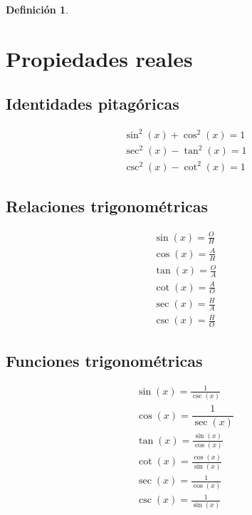 \documentclass[a5paper,12pt,twoside]{book}
\newtheorem{defn}{{Definición}}[chapter]
\begin{document}
\begin{mdframed}[style=DefinitionFrame]
    \begin{defn}
    \end{defn}
\end{mdframed}


\chapter{Propiedades reales}


\section{Identidades pitagóricas}

\begin{gather*}
    \sin^2{(x)} + \cos^2{(x)} = 1
    \\
    \sec^2{(x)} - \tan^2{(x)} = 1
    \\
    \csc^2{(x)} - \cot^2{(x)} = 1
\end{gather*}


\section{Relaciones trigonométricas}

\begin{gather*}
    \sin{(x)}=\frac{O}{H}
    \\[1ex]
    \cos{(x)}=\frac{A}{H}
    \\[1ex]
    \tan{(x)}=\frac{O}{A}
    \\[1ex]
    \cot{(x)}=\frac{A}{O}
    \\[1ex]
    \sec{(x)}=\frac{H}{A}
    \\[1ex]
    \csc{(x)}=\frac{H}{O}
\end{gather*}


\section{Funciones trigonométricas}

\begin{gather*}
    \sin{(x)}=\frac{1}{\csc{(x)}}
    \\[1ex]
    \cos{(x)}=\dfrac{1}{\sec{(x)}}
    \\[1ex]
    \tan{(x)}=\frac{\sin{(x)}}{\cos{(x)}}
    \\[1ex]
    \cot{(x)}=\frac{\cos{(x)}}{\sin{(x)}}
    \\[1ex]
    \sec{(x)}=\frac{1}{\cos{(x)}}
    \\[1ex]
    \csc{(x)}=\frac{1}{\sin{(x)}}
\end{gather*}
\end{document}
